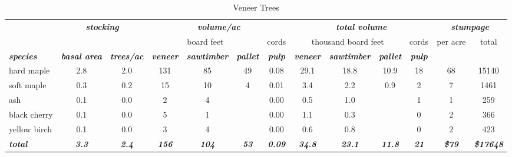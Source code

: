 \documentclass[landscape]{article}
\begin{document}
\begin{table}[H]

\caption{\label{tab:unnamed-chunk-4}Veneer Trees}
\fontsize{10}{12}\selectfont
\begin{tabular}[t]{lcccccccccccc}
\toprule
\multicolumn{1}{c}{\em{\textbf{ }}} & \multicolumn{2}{c}{\em{\textbf{stocking}}} & \multicolumn{4}{c}{\em{\textbf{volume/ac }}} & \multicolumn{4}{c}{\em{\textbf{total volume}}} & \multicolumn{2}{c}{\em{\textbf{stumpage}}} \\
\cmidrule(l{3pt}r{3pt}){2-3} \cmidrule(l{3pt}r{3pt}){4-7} \cmidrule(l{3pt}r{3pt}){8-11} \cmidrule(l{3pt}r{3pt}){12-13}
\multicolumn{3}{c}{ } & \multicolumn{3}{c}{board feet} & \multicolumn{1}{c}{cords} & \multicolumn{3}{c}{thousand board feet} & \multicolumn{1}{c}{cords} & \multicolumn{1}{c}{per acre} & \multicolumn{1}{c}{total} \\
\cmidrule(l{3pt}r{3pt}){4-6} \cmidrule(l{3pt}r{3pt}){7-7} \cmidrule(l{3pt}r{3pt}){8-10} \cmidrule(l{3pt}r{3pt}){11-11} \cmidrule(l{3pt}r{3pt}){12-12} \cmidrule(l{3pt}r{3pt}){13-13}
\rowcolor[HTML]{DCDCDC}  \em{\textbf{species}} & \em{\textbf{basal area}} & \em{\textbf{trees/ac}} & \em{\textbf{veneer}} & \em{\textbf{sawtimber}} & \em{\textbf{pallet}} & \em{\textbf{pulp}} & \em{\textbf{veneer}} & \em{\textbf{sawtimber}} & \em{\textbf{pallet}} & \em{\textbf{pulp}} & \em{\textbf{ }} & \em{\textbf{ }}\\
\midrule
\rowcolor{gray!6}  hard maple & 2.8 & 2.0 & 131 & 85 & 49 & 0.08 & 29.1 & 18.8 & 10.9 & 18 & 68 & 15140\\
 
soft maple & 0.3 & 0.2 & 15 & 10 & 4 & 0.01 & 3.4 & 2.2 & 0.9 & 2 & 7 & 1461\\
 
\rowcolor{gray!6}  ash & 0.1 & 0.0 & 2 & 4 &  & 0.00 & 0.5 & 1.0 &  & 1 & 1 & 259\\
 
black cherry & 0.1 & 0.0 & 5 & 1 &  & 0.00 & 1.1 & 0.3 &  & 0 & 2 & 366\\
 
\rowcolor{gray!6}  yellow birch & 0.1 & 0.0 & 3 & 4 &  & 0.00 & 0.6 & 0.8 &  & 0 & 2 & 423\\
 
\rowcolor[HTML]{DCDCDC}  \em{\textbf{total}} & \em{\textbf{3.3}} & \em{\textbf{2.4}} & \em{\textbf{156}} & \em{\textbf{104}} & \em{\textbf{53}} & \em{\textbf{0.09}} & \em{\textbf{34.8}} & \em{\textbf{23.1}} & \em{\textbf{11.8}} & \em{\textbf{21}} & \em{\textbf{\$79}} & \em{\textbf{\$17648}}\\
\bottomrule
\end{tabular}
\end{table}
\end{document}

